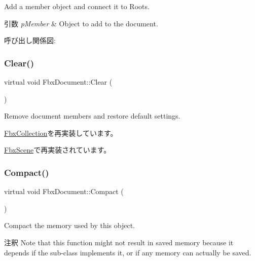 Add a member object and connect it to Roots. 
\begin{DoxyParams}{引数}
{\em p\+Member} & Object to add to the document. \\
\hline
\end{DoxyParams}
呼び出し関係図\+:
\mbox{\label{class_fbx_document_ac8fa73e98a73c4f6637466e58d069bbe}} 
\subsubsection{\texorpdfstring{Clear()}{Clear()}}
{\footnotesize\ttfamily virtual void Fbx\+Document\+::\+Clear (\begin{DoxyParamCaption}{ }\end{DoxyParamCaption})\hspace{0.3cm}{\ttfamily [virtual]}}



Remove document members and restore default settings. 



\hyperlink{class_fbx_collection_a79ba35ab4693cd1b1c79a221d7d2f8d3}{Fbx\+Collection}を再実装しています。



\hyperlink{class_fbx_scene_ab578ff733eb8f6af89ff1645852966cd}{Fbx\+Scene}で再実装されています。

\mbox{\label{class_fbx_document_a62a41699423c0431a1e0969e9dea176d}} 
\subsubsection{\texorpdfstring{Compact()}{Compact()}}
{\footnotesize\ttfamily virtual void Fbx\+Document\+::\+Compact (\begin{DoxyParamCaption}{ }\end{DoxyParamCaption})\hspace{0.3cm}{\ttfamily [virtual]}}

Compact the memory used by this object. \begin{DoxyRemark}{注釈}
Note that this function might not result in saved memory because it depends if the sub-\/class implements it, or if any memory can actually be saved. 
\end{DoxyRemark}



